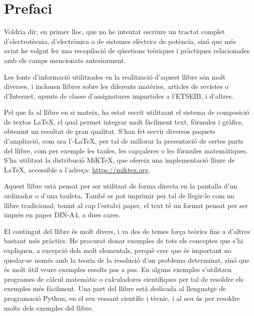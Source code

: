 \chapter*{Prefaci} 

   Voldria dir, en primer lloc, que no he intentat escriure un tractat complet
   d'electrotècnia, d'electrònica o de sistemes elèctrics de potència, sinó que més aviat
   he volgut
   fer una recopilació de qüestions teòriques i pràctiques relacionades amb els camps mencionats
   anteriorment.

   Les fonts d'informació utilitzades en la realització d'aquest llibre són molt diverses,
   i inclouen llibres sobre les diferents matèries, articles de revistes o d'Internet,
   apunts de classe d'assignatures impartides a l'ETSEIB, i d'altres.

   Pel que fa al llibre en si mateix, ha estat escrit utilitzant el sistema de composició de
   textos \LaTeX, el qual
   permet integrar molt fàcilment text, fórmules i gràfics, obtenint un resultat de
   gran qualitat. S'han fet servir diversos paquets d'ampliació, com ara
   l'\AmS-\LaTeX,
   per tal de millorar la presentació de certes parts del
   llibre, com per exemple les taules, les capçaleres o les fórmules matemàtiques. S'ha utilitzat la distribució MiK\TeX, que ofereix una implementació lliure de \LaTeX{}, accessible a l'adreça: \href{https://miktex.org/}{https://miktex.org}.

   Aquest llibre està pensat per  ser utilitzat  de forma directa en la pantalla d'un
   ordinador o d'una tauleta. També es pot imprimir per tal de llegir-lo com un llibre tradicional;  tenint al cap l'estalvi paper, el text
   té un format pensat per  ser imprès en paper DIN-A4, a dues cares.

    El contingut del llibre és molt divers, i va des de temes força teòrics fins a
    d'altres bastant més pràctics. He procurat donar exemples de tots els conceptes
    que s'hi expliquen, a excepció dels molt elementals, perquè crec que és important
     no quedar-se només amb la teoria de  la resolució d'un problema determinat, sinó que
     és molt útil veure exemples resolts pas a pas. En alguns exemples s'utilitzen programes de càlcul matemàtic o calculadores científiques per tal de resoldre els exemples més fàcilment. Una part  del llibre està dedicada al llenguatge de programació Python, en el seu vessant científic i tècnic, i al seu ús  per resoldre molts dels exemples del llibre.
     
